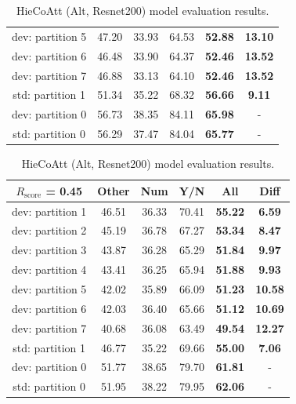 \documentclass[letterpaper]{article}
\newcommand{\rscore}{}\def\rscore/{$R_{\text{score}}$}
\begin{document}
\begin{table}
\begin{subtable}{0.49\linewidth}
\begin{adjustbox}{width=0.46\columnwidth}
\begin{tabular}{c | c c c c | c}
			dev: partition 5 & 47.20 & 33.93 & 64.53 & \textbf{52.88} & \textbf{13.10} \\
			dev: partition 6 & 46.48 & 33.90 & 64.37 & \textbf{52.46} & \textbf{13.52} \\
			dev: partition 7 & 46.88 & 33.13 & 64.10 & \textbf{52.46} & \textbf{13.52} \\
			\hline
			std: partition 1 & 51.34 & 35.22 & 68.32 & \textbf{56.66} & \textbf{9.11}  \\
			\hline
			dev: partition 0 & 56.73 & 38.35 & 84.11 & \textbf{65.98} & -              \\
			std: partition 0 & 56.29 & 37.47 & 84.04 & \textbf{65.77} & -              \\
			\hline
		\end{tabular}
\end{adjustbox}
		\caption{MUTAN with Attention model evaluation results.}

		\begin{adjustbox}{width=0.46\columnwidth}
\begin{tabular}{c | c c c c | c}
			\rscore/ = 0.45  & Other & Num   & Y/N   & All            & Diff           \\ [0.5ex]
			\hline
			dev: partition 1 & 46.51 & 36.33 & 70.41 & \textbf{55.22} & \textbf{6.59}  \\
			dev: partition 2 & 45.19 & 36.78 & 67.27 & \textbf{53.34} & \textbf{8.47}  \\
			dev: partition 3 & 43.87 & 36.28 & 65.29 & \textbf{51.84} & \textbf{9.97}  \\
			dev: partition 4 & 43.41 & 36.25 & 65.94 & \textbf{51.88} & \textbf{9.93}  \\
			dev: partition 5 & 42.02 & 35.89 & 66.09 & \textbf{51.23} & \textbf{10.58} \\
			dev: partition 6 & 42.03 & 36.40 & 65.66 & \textbf{51.12} & \textbf{10.69} \\
			dev: partition 7 & 40.68 & 36.08 & 63.49 & \textbf{49.54} & \textbf{12.27} \\
			\hline
			std: partition 1 & 46.77 & 35.22 & 69.66 & \textbf{55.00} & \textbf{7.06}  \\
			\hline
			dev: partition 0 & 51.77 & 38.65 & 79.70 & \textbf{61.81} & -              \\
			std: partition 0 & 51.95 & 38.22 & 79.95 & \textbf{62.06} & -              \\
			\hline
		\end{tabular}
\end{adjustbox}
		\caption{HieCoAtt (Alt, Resnet200) model evaluation results.}


\end{subtable}
\end{table}
\end{document}

